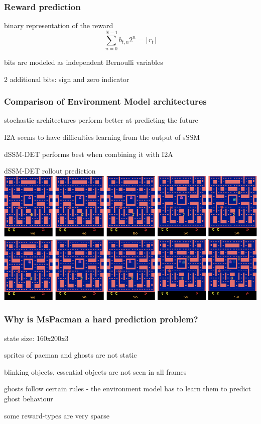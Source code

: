 \begin{frame}
	\frametitle{Reward prediction}
	\begin{PraesentationAufzaehlung}
		\item binary representation of the reward
		\begin{equation}
			\sum_{n=0}^{N-1}b_{t,n}2^n = \lfloor r_t \rfloor
		\end{equation}
		\item bits are modeled as independent Bernoulli variables
		\item 2 additional bits: sign and zero indicator
	\end{PraesentationAufzaehlung}
\end{frame}


\begin{frame}
	\frametitle{Comparison of Environment Model architectures}
	\begin{PraesentationAufzaehlung}
		\item stochastic architectures perform better at predicting the future\\
		\item I2A seems to have difficulties learning from the output of sSSM
		\item dSSM-DET performs best when combining it with I2A
	\end{PraesentationAufzaehlung}
\end{frame}




\begin{frame}{dSSM-DET rollout prediction}
    \includegraphics[width=\textwidth]{./latent_i2a_images/dSSM_rollout_prediction.png}
\end{frame}



\begin{frame}
	\frametitle{Why is MsPacman a hard prediction problem?}
	\begin{PraesentationAufzaehlung}
		\item state size: 160x200x3
		\item sprites of pacman and ghosts are not static
		\item blinking objects, essential objects are not seen in all frames
		\item ghosts follow certain rules - the environment model has to learn them to predict ghost behaviour
		\item some reward-types are very sparse
	\end{PraesentationAufzaehlung}
\end{frame}

